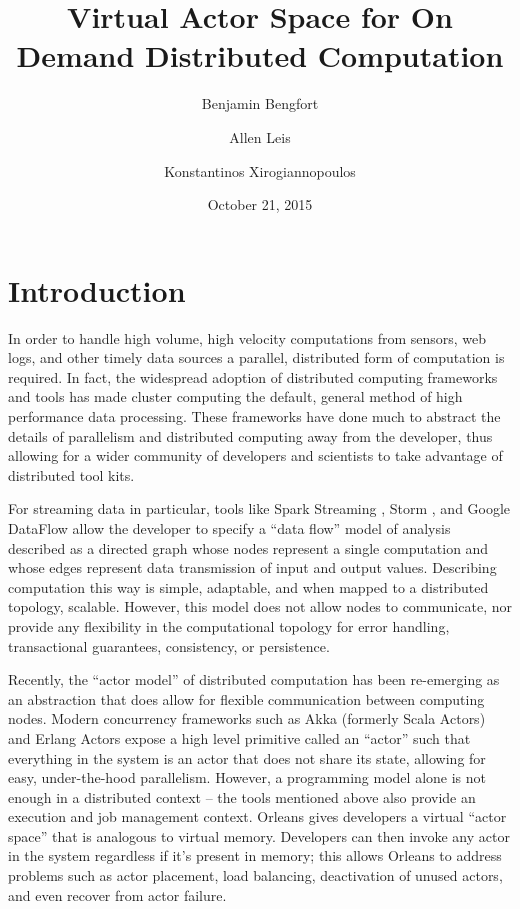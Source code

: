 \documentclass[11pt,letterpaper]{article}
\begin{document}
\title{Virtual Actor Space for On Demand Distributed Computation}
\author[1]{Benjamin Bengfort}
\author[2]{Allen Leis}
\author[1]{Konstantinos Xirogiannopoulos}

\date{October 21, 2015}

\maketitle
\section*{Introduction}

In order to handle high volume, high velocity computations from sensors, web logs, and other timely data sources a parallel, distributed form of computation is required. In fact, the widespread adoption of distributed computing frameworks and tools has made cluster computing the default, general method of high performance data processing. These frameworks have done much to abstract the details of parallelism and distributed computing away from the developer, thus allowing for a wider community of developers and scientists to take advantage of distributed tool kits.

For streaming data in particular, tools like Spark Streaming \cite{zaharia2012discretized}, Storm \cite{toshniwal2014storm}, and Google DataFlow \cite{akidau2015dataflow} allow the developer to specify a ``data flow'' model of analysis described as a directed graph whose nodes represent a single computation and whose edges represent data transmission of input and output values. Describing computation this way is simple, adaptable, and when mapped to a distributed topology, scalable. However, this model does not allow nodes to communicate, nor provide any flexibility in the computational topology for error handling, transactional guarantees, consistency, or persistence.

Recently, the ``actor model'' \cite{hewitt1973universal} of distributed computation has been re-emerging as an abstraction that does allow for flexible communication between computing nodes. Modern concurrency frameworks such as Akka (formerly Scala Actors) \cite{karmani2009actor} and Erlang Actors \cite{vinoski2007concurrency} expose a high level primitive called an ``actor'' such that everything in the system is an actor that does not share its state, allowing for easy, under-the-hood parallelism. However, a programming model alone is not enough in a distributed context -- the tools mentioned above also provide an execution and job management context. Orleans \cite{bernstein_orleans_2015} gives developers a virtual ``actor space'' that is analogous to virtual memory. Developers can then invoke any actor in the system regardless if it's present in memory; this allows Orleans to address problems such as actor placement, load balancing, deactivation of unused actors, and even recover from actor failure.
\end{document}
